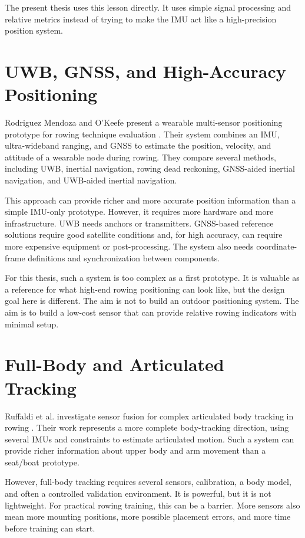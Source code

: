 The present thesis uses this lesson directly. It uses simple signal processing and relative metrics instead of trying to make the IMU act like a high-precision position system.

\section{UWB, GNSS, and High-Accuracy Positioning}

Rodriguez Mendoza and O'Keefe present a wearable multi-sensor positioning prototype for rowing technique evaluation \cite{rodriguez_mendoza_wearable_2024}. Their system combines an IMU, ultra-wideband ranging, and GNSS to estimate the position, velocity, and attitude of a wearable node during rowing. They compare several methods, including UWB, inertial navigation, rowing dead reckoning, GNSS-aided inertial navigation, and UWB-aided inertial navigation.

This approach can provide richer and more accurate position information than a simple IMU-only prototype. However, it requires more hardware and more infrastructure. UWB needs anchors or transmitters. GNSS-based reference solutions require good satellite conditions and, for high accuracy, can require more expensive equipment or post-processing. The system also needs coordinate-frame definitions and synchronization between components.

For this thesis, such a system is too complex as a first prototype. It is valuable as a reference for what high-end rowing positioning can look like, but the design goal here is different. The aim is not to build an outdoor positioning system. The aim is to build a low-cost sensor that can provide relative rowing indicators with minimal setup.

\section{Full-Body and Articulated Tracking}

Ruffaldi et al. investigate sensor fusion for complex articulated body tracking in rowing \cite{ruffaldi_sensor_2015}. Their work represents a more complete body-tracking direction, using several IMUs and constraints to estimate articulated motion. Such a system can provide richer information about upper body and arm movement than a seat/boat prototype.

However, full-body tracking requires several sensors, calibration, a body model, and often a controlled validation environment. It is powerful, but it is not lightweight. For practical rowing training, this can be a barrier. More sensors also mean more mounting positions, more possible placement errors, and more time before training can start.

